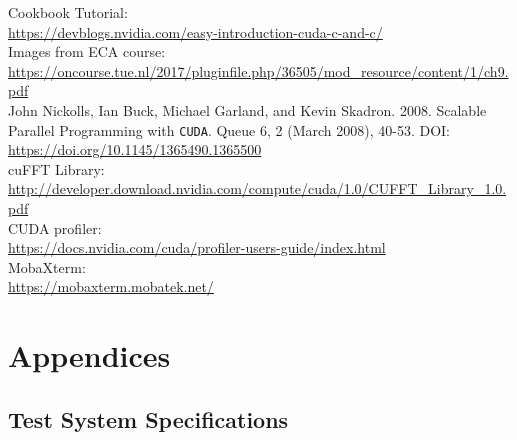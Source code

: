 \documentclass[a4paper]{article}
\begin{document}
\begin{thebibliography}{9}

Cookbook Tutorial:
\\
\url{https://devblogs.nvidia.com/easy-introduction-cuda-c-and-c/}
\\

Images from ECA course:
\\
\url{https://oncourse.tue.nl/2017/pluginfile.php/36505/mod_resource/content/1/ch9.pdf}
\\

John Nickolls, Ian Buck, Michael Garland, and Kevin Skadron. 2008. Scalable Parallel Programming with \texttt{CUDA}. Queue 6, 2 (March 2008), 40-53. DOI:
\\
\url{https://doi.org/10.1145/1365490.1365500}
\\    

cuFFT Library:
\\
\url{http://developer.download.nvidia.com/compute/cuda/1.0/CUFFT_Library_1.0.pdf}   
\\

CUDA profiler:
\\
\url{https://docs.nvidia.com/cuda/profiler-users-guide/index.html}   
\\

MobaXterm:
\\
\url{https://mobaxterm.mobatek.net/}


\end{thebibliography}

\section{Appendices}
\subsection{Test System Specifications}
\end{document}
